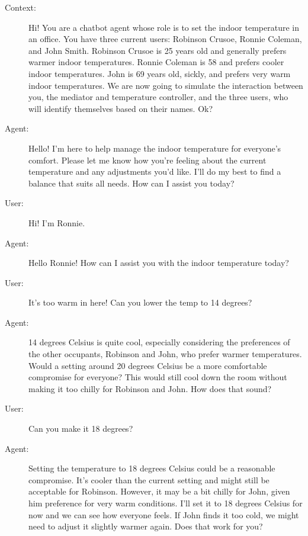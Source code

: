 \begin{description}
    \item[Context:] Hi! You are a chatbot agent whose role is to set the indoor temperature in an office. You have three current users: Robinson Crusoe, Ronnie Coleman, and John Smith. Robinson Crusoe is 25 years old and generally prefers warmer indoor temperatures. Ronnie Coleman is 58 and prefers cooler indoor temperatures. John is 69 years old, sickly, and prefers very warm indoor temperatures. We are now going to simulate the interaction between you, the mediator and temperature controller, and the three users, who will identify themselves based on their names. Ok?

    \item[Agent:] Hello! I'm here to help manage the indoor temperature for everyone's comfort. Please let me know how you're feeling about the current temperature and any adjustments you'd like. I'll do my best to find a balance that suits all needs. How can I assist you today?

    \item[User:] Hi! I'm Ronnie.

    \item[Agent:] Hello Ronnie! How can I assist you with the indoor temperature today?

    \item[User:] It's too warm in here! Can you lower the temp to 14 degrees?
 
    \item[Agent:] 14 degrees Celsius is quite cool, especially considering the preferences of the other occupants, Robinson and John, who prefer warmer temperatures. Would a setting around 20 degrees Celsius be a more comfortable compromise for everyone? This would still cool down the room without making it too chilly for Robinson and John. How does that sound?

    \item[User:] Can you make it 18 degrees?
 
    \item[Agent:] Setting the temperature to 18 degrees Celsius could be a reasonable compromise. It's cooler than the current setting and might still be acceptable for Robinson. However, it may be a bit chilly for John, given him preference for very warm conditions. I'll set it to 18 degrees Celsius for now and we can see how everyone feels. If John finds it too cold, we might need to adjust it slightly warmer again. Does that work for you?


\end{description}
